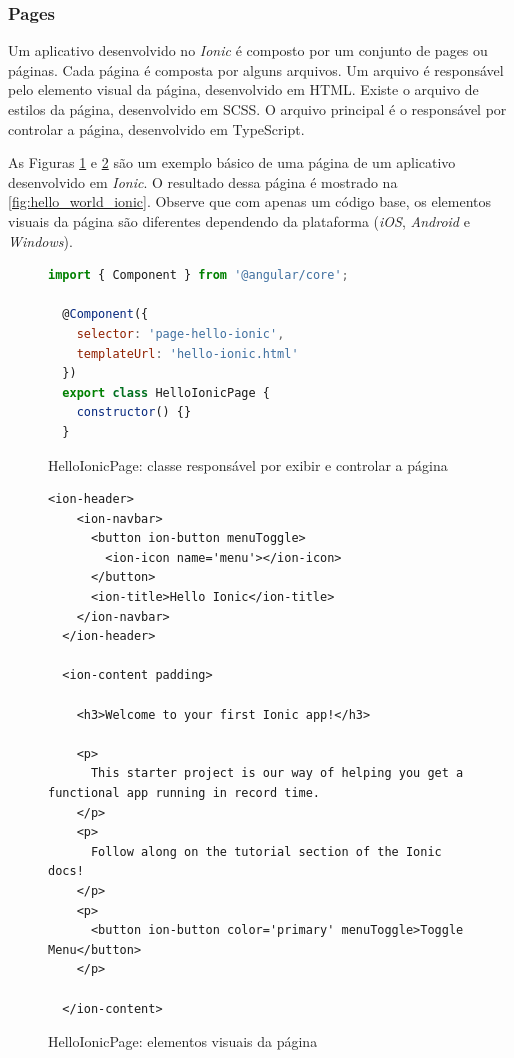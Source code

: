 \subsubsection{Pages}

Um aplicativo desenvolvido no \textit{Ionic} é composto por um conjunto de pages ou páginas.
Cada página é composta por alguns arquivos. Um arquivo é responsável pelo
elemento visual da página, desenvolvido em HTML. Existe o arquivo de estilos da página,
desenvolvido em SCSS. O arquivo principal é o responsável por controlar a página, desenvolvido
em TypeScript.

As Figuras \ref{fig:hello_ionic_ts} e \ref{fig:hello_ionic_html} são um exemplo básico de
uma página de um aplicativo desenvolvido em \textit{Ionic}. O resultado dessa página é mostrado
na \autoref{fig:hello_world_ionic}. Observe que com apenas um código base, os elementos
visuais da página são diferentes dependendo da plataforma (\textit{iOS}, \textit{Android} e \textit{Windows}).

\begin{figure}[h]
\begin{lstlisting}[language=JavaScript]
  import { Component } from '@angular/core';

  @Component({
    selector: 'page-hello-ionic',
    templateUrl: 'hello-ionic.html'
  })
  export class HelloIonicPage {
    constructor() {}
  }
\end{lstlisting}
\caption{HelloIonicPage: classe responsável por exibir e controlar a página}
\label{fig:hello_ionic_ts}
\end{figure}

\begin{figure}[h]
\begin{lstlisting}[language=ionicHtml]
  <ion-header>
    <ion-navbar>
      <button ion-button menuToggle>
        <ion-icon name='menu'></ion-icon>
      </button>
      <ion-title>Hello Ionic</ion-title>
    </ion-navbar>
  </ion-header>

  <ion-content padding>

    <h3>Welcome to your first Ionic app!</h3>

    <p>
      This starter project is our way of helping you get a functional app running in record time.
    </p>
    <p>
      Follow along on the tutorial section of the Ionic docs!
    </p>
    <p>
      <button ion-button color='primary' menuToggle>Toggle Menu</button>
    </p>

  </ion-content>
\end{lstlisting}
\caption{HelloIonicPage: elementos visuais da página}
\label{fig:hello_ionic_html}
\end{figure}

